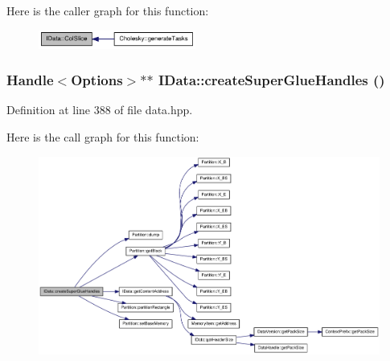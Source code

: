 Here is the caller graph for this function:\nopagebreak
\begin{figure}[H]
\begin{center}
\leavevmode
\includegraphics[width=146pt]{class_i_data_a649b1ad6a0cfff3c7e2e89557375ea11_icgraph}
\end{center}
\end{figure}
\hypertarget{class_i_data_afbc48e6b22a12e8bcd7694c5613bf866}{
\subsubsection[{createSuperGlueHandles}]{\setlength{\rightskip}{0pt plus 5cm}Handle$<${\bf Options}$>$$\ast$$\ast$ IData::createSuperGlueHandles ()}}
\label{class_i_data_afbc48e6b22a12e8bcd7694c5613bf866}


Definition at line 388 of file data.hpp.

Here is the call graph for this function:\nopagebreak
\begin{figure}[H]
\begin{center}
\leavevmode
\includegraphics[width=420pt]{class_i_data_afbc48e6b22a12e8bcd7694c5613bf866_cgraph}
\end{center}
\end{figure}


